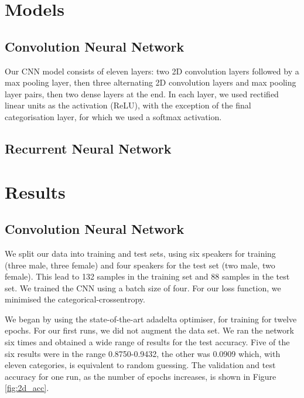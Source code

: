 \documentclass{article} %
\begin{document}
\section{Models}
\subsection{Convolution Neural Network}
Our CNN model consists of eleven layers: two 2D convolution layers followed by a max pooling layer, then three alternating 2D convolution layers and max pooling layer pairs, then two dense layers at the end. In each layer, we used rectified linear units as the activation (ReLU), with the exception of the final categorisation layer, for which we used a softmax activation. 
 
\subsection{Recurrent Neural Network}

\section{Results}
\subsection{Convolution Neural Network}
We split our data into training and test sets, using six speakers for training (three male, three female) and four speakers for the test set (two male, two female). This lead to 132 samples in the training set and 88 samples in the test set. We trained the CNN using a batch size of four. For our loss function, we minimised the categorical-crossentropy.

We began by using the state-of-the-art adadelta optimiser, for training for twelve epochs. For our first runs, we did not augment the data set. We ran the network six times and obtained a wide range of results for the test accuracy. Five of the six results were in the range 0.8750-0.9432, the other was 0.0909 which, with eleven categories, is equivalent to random guessing. The validation and test accuracy for one run, as the number of epochs increases, is shown in Figure \ref{fig:2d_acc}.
\end{document}
